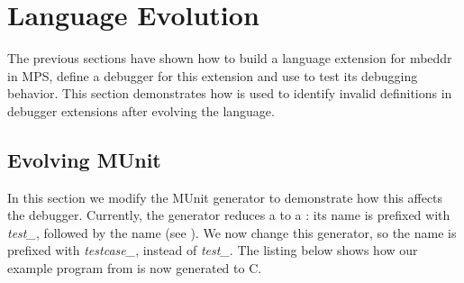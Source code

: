 \section{Language Evolution}

The previous sections have shown how to build a language extension for mbeddr in
\ac{MPS}, define a debugger for this extension and use  to test its
debugging behavior.
This section demonstrates how  is used to identify invalid definitions
in debugger extensions after evolving the language.

\subsection{Evolving MUnit}

In this section we modify the MUnit generator to demonstrate how this affects
the debugger. Currently, the generator reduces a  to a
: its name is prefixed with \emph{test\_}, 
followed by the  name (see ).
We now change this generator, so the  name is prefixed
with \emph{testcase\_}, instead of \emph{test\_}.
The listing below shows how our example program from  is
now generated to C.

